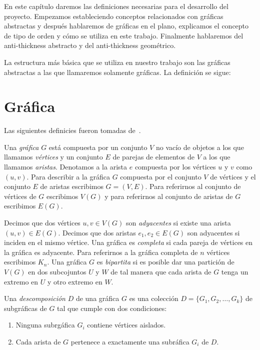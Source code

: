 En este capítulo daremos las definiciones necesarias para el desarrollo del proyecto.
Empezamos estableciendo conceptos relacionados con gráficas abstractas y después
hablaremos de gráficas en el plano, explicamos el concepto de tipo de orden y cómo
se utiliza en este trabajo. Finalmente hablaremos del anti-thickness abstracto
y del anti-thickness geométrico.

La estructura más básica que se utiliza en nuestro trabajo son las gráficas abstractas
a las que llamaremos solamente gráficas. La definición se sigue:
\section{Gráfica}
Las siguientes definicies fueron tomadas de~\cite{Chartrand2008}.

Una \emph{gráfica} $G$ está compuesta por un conjunto $V$ no vacío de objetos a los que llamamos \emph{vértices}
y un conjunto $E$ de parejas de elementos de $V$ a los que llamamos \emph{aristas}. Denotamos
a la arista $e$ compuesta por los vértices $u$ y $v$ como $(u,v)$. Para describir a la gráfica $G$
compuesta por el conjunto $V$ de vértices y el conjunto $E$ de aristas escribimos $G=(V,E)$.
Para referirnos al conjunto de vértices de $G$ escribimos $V(G)$ y para referirnos
al conjunto de aristas de $G$ escribimos $E(G)$.

Decimos que dos vértices $u,v\in V(G)$ son \emph{adyacentes} si existe una arista
$(u,v)\in E(G)$. Decimos que dos aristas $e_1,e_2 \in E(G)$ son adyacentes
si inciden en el mismo vértice. Una gráfica es \emph{completa} si cada pareja de vértices
en la gráfica es adyacente. Para referirnos a la gráfica completa de $n$ vértices
escribimos $K_n$. Una gráfica $G$ es \emph{bipartita} si es posible
dar una partición de $V(G)$ en dos subcojuntos $U$ y $W$ de tal manera que cada
arista de $G$ tenga un extremo en $U$ y otro extremo en $W$.

Una \emph{descomposición} $D$ de una gráfica $G$ es una colección $D=\{G_1,G_2,\dots,G_k\}$ de
subgráficas de $G$ tal que cumple con dos condiciones:
\begin{enumerate}
  \item Ninguna subrgáfica $G_i$ contiene vértices aislados.
  \item Cada arista de $G$ pertenece a exactamente una subráfica $G_i$ de $D$.
\end{enumerate}
